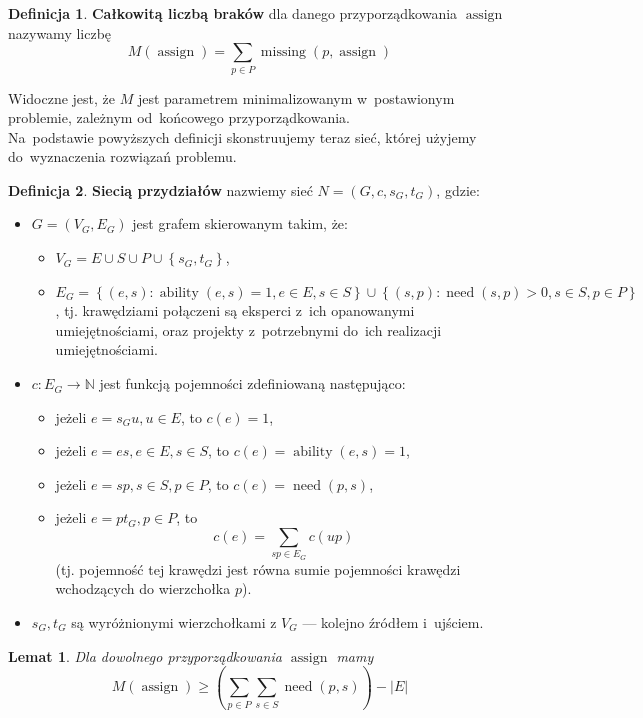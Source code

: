 \documentclass[12pt,a4paper]{article}
\newtheorem{lem}{Lemat}
\theoremstyle{definition}
\newtheorem{defn}{Definicja}
\DeclareMathOperator{\ability}{ability}
\DeclareMathOperator{\need}{need}
\DeclareMathOperator{\assign}{assign}
\DeclareMathOperator{\missing}{missing}
\begin{document}
\begin{defn}
\textbf{Całkowitą liczbą braków} dla danego przyporządkowania $\assign$ nazywamy
liczbę
$$ M(\assign) = \sum_{p \in P} \missing(p, \assign) $$
\end{defn}

\noindent
Widoczne jest, że $M$ jest parametrem minimalizowanym w~postawionym problemie,
zależnym od~końcowego przyporządkowania.\\

\noindent
Na~podstawie powyższych definicji skonstruujemy teraz sieć, której użyjemy
do~wyznaczenia rozwiązań problemu.

\begin{defn}
\textbf{Siecią przydziałów} nazwiemy sieć $N = \left(G,c,s_G,t_G\right)$, gdzie:
\begin{itemize}
	\item $G = \left(V_G,E_G\right)$ jest grafem skierowanym takim, że:
	\begin{itemize}
		\item $V_G = E \cup S \cup P \cup \left\lbrace s_G,t_G \right\rbrace$,
		\item $E_G = \left\lbrace (e,s) : \ability(e,s) = 1, e \in E, s \in S
		\right\rbrace \cup \left\lbrace (s,p) : \need(s,p) > 0, s \in S, p \in P
		\right\rbrace$, tj. krawędziami połączeni są eksperci z~ich opanowanymi
		umiejętnościami, oraz projekty z~potrzebnymi do~ich realizacji
		umiejętnościami.
	\end{itemize}
	\item $c : E_G \to \mathbb{N}$ jest funkcją pojemności zdefiniowaną
	następująco:
	\begin{itemize}
		\item jeżeli $e = s_G u, u \in E$, to $c(e) = 1$,
		\item jeżeli $e = es, e \in E, s \in S$, to $c(e) = \ability(e,s) = 1$,
		\item jeżeli $e = sp, s \in S, p \in P$, to $c(e) = \need(p,s)$,
		\item jeżeli $e = pt_G, p \in P$, to
		$$c(e) = \sum_{sp \in E_G} c(up)$$
		(tj. pojemność tej krawędzi jest równa sumie pojemności krawędzi
		wchodzących do wierzchołka $p$).
	\end{itemize}
	\item $s_G,t_G$ są wyróżnionymi wierzchołkami z $V_G$ --- kolejno źródłem
	i~ujściem.
\end{itemize}
\end{defn}

\begin{lem}
Dla dowolnego przyporządkowania $\assign$ mamy
$$ M(\assign) \geq \left( \sum_{p \in P} \sum_{s \in S} \need(p,s) \right)
- |E| $$
\end{lem}
\end{document}
